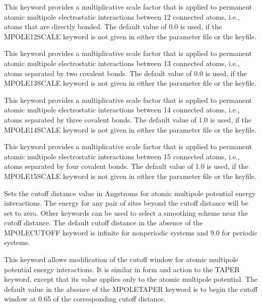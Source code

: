 \documentclass[letterpaper,11pt,english]{sphinxmanual}
\begin{document}
  This keyword provides a multiplicative scale factor that is applied to permanent atomic multipole electrostatic interactions between 1\sphinxhyphen{}2 connected atoms, i.e., atoms that are directly bonded. The default value of 0.0 is used, if the MPOLE\sphinxhyphen{}12\sphinxhyphen{}SCALE keyword is not given in either the parameter file or the keyfile.

  This keyword provides a multiplicative scale factor that is applied to permanent atomic multipole  electrostatic interactions between 1\sphinxhyphen{}3 connected atoms, i.e., atoms separated by two covalent bonds. The default value of 0.0 is used, if the MPOLE\sphinxhyphen{}13\sphinxhyphen{}SCALE keyword is not given in either the parameter file or the keyfile.

  This keyword provides a multiplicative scale factor that is applied to permanent atomic multipole  electrostatic interactions between 1\sphinxhyphen{}4 connected atoms, i.e., atoms separated by three covalent bonds. The default value of 1.0 is used, if the MPOLE\sphinxhyphen{}14\sphinxhyphen{}SCALE keyword is not given in either the parameter file or the keyfile.

  This keyword provides a multiplicative scale factor that is applied to permanent atomic multipole  electrostatic interactions between 1\sphinxhyphen{}5 connected atoms, i.e., atoms separated by four covalent bonds. The default value of 1.0 is used, if the MPOLE\sphinxhyphen{}15\sphinxhyphen{}SCALE keyword is not given in either the parameter file or the keyfile.

  Sets the cutoff distance value in Angstroms for atomic multipole potential energy interactions. The energy for any pair of sites beyond the cutoff distance will be set to zero. Other keywords can be used to select a smoothing scheme near the cutoff distance. The default cutoff distance in the absence of the MPOLE\sphinxhyphen{}CUTOFF keyword is infinite for nonperiodic systems and 9.0 for periodic systems.


  This keyword allows modification of the cutoff window for atomic multipole potential energy interactions. It is similar in form and action to the TAPER keyword, except that its value applies only to the atomic multipole potential. The default value in the absence of the MPOLE\sphinxhyphen{}TAPER keyword is to begin the cutoff window at 0.65 of the corresponding cutoff distance.
\end{document}
